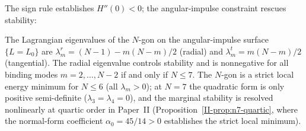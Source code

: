 The sign rule establishes $H''(0) < 0$; the angular-impulse
constraint rescues stability:

\begin{theorem}
\label{thm:constrained-min}
The Lagrangian eigenvalues of the $N$-gon on the
angular-impulse surface $\{L = L_0\}$ are
$\lambda_m^r = (N{-}1) - m(N{-}m)/2$ (radial) and
$\lambda_m^t = m(N{-}m)/2$ (tangential).
The radial eigenvalue controls stability and is nonnegative
for all binding modes $m = 2,\ldots,N{-}2$
if and only if $N \le 7$.
The $N$-gon is a strict local energy minimum for $N \le 6$
(all $\lambda_m > 0$);
at $N = 7$ the quadratic form is only positive semi-definite
($\lambda_3 = \lambda_4 = 0$), and the marginal stability is
resolved nonlinearly at quartic order in Paper~II
(Proposition~\ref*{II-prop:n7-quartic},
where the normal-form coefficient $\alpha_0 = 45/14 > 0$
establishes the strict local minimum).
\end{theorem}

